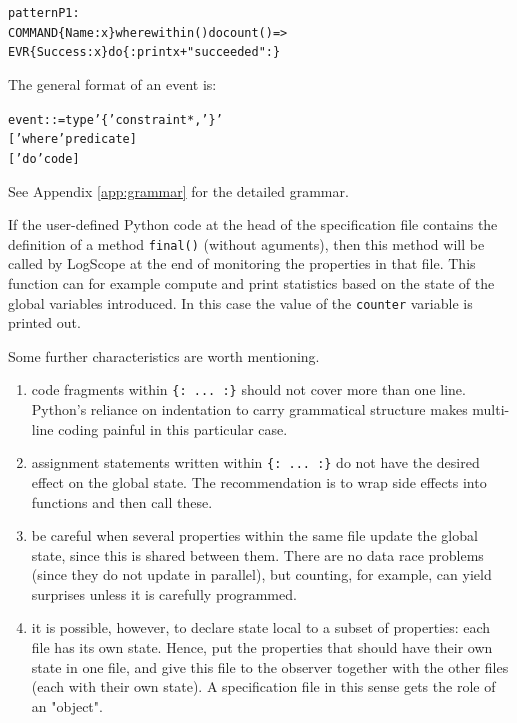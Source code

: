 \documentclass{report}
\newcommand{\python}{{\sc Python}}
\newcommand{\logscope}{{\sc LogScope}}
\newenvironment{code}[1] %
{
\vspace{0.5cm}
\begin{center}
\begin{Sbox}
\begin{minipage}{11cm}
\begin{alltt}
{\bf\em #1}
}
{
\end{alltt}
\end{minipage}
\end{Sbox}
\setlength{\fboxsep}{8pt}
\fbox{\TheSbox}
\end{center}
\vspace{0.5cm}
}
\begin{document}
\begin{code}{}
pattern P1 :
  COMMAND\{Name : x\} where within() do count() => 
    EVR\{Success : x\} do \{: print x + " succeeded" :\}
\end{code}

\noindent The general format of an event is:

\begin{code}{}
  event ::= type '\{' constraint*, '\}' 
               ['where' predicate] 
               ['do' code]
\end{code}

\noindent See Appendix \ref{app:grammar} for the detailed grammar.

\vspace{0.3cm}

\noindent If the user-defined \python{} code at the head of the specification file contains
the definition of a method \verb+final()+ (without aguments), then this method will be called by
\logscope{} at the end of monitoring the properties in that file. This function can for example compute and print statistics based
on the state of the global variables introduced. In this case the value of the {\tt counter} variable is
printed out.

\vspace{0.3cm}

\noindent
Some further characteristics are worth mentioning.

\begin{enumerate}

  \item code fragments within \verb+{: ... :}+ should not cover more than one line. \python's reliance on 
           indentation to carry grammatical structure makes multi-line coding painful in this particular case.

  \item assignment statements written within \verb+{: ... :}+ do not have the desired effect on the global
           state. The recommendation is to wrap side effects into functions and then call these.

  \item be careful when several properties within the same file update the global state, since this is
           shared between them. There are no data race problems (since they do not update in parallel), 
           but counting, for example, can yield
           surprises unless it is carefully programmed. 
           
  \item  it is possible, however, to declare state local to
            a subset of properties: each file has its own state. Hence, put the properties that should
            have their own state in one file, and give this file to the observer together with the other files
            (each with their own state). A specification file in this sense gets the role of an "object".
    
\end{enumerate}
\end{document}
